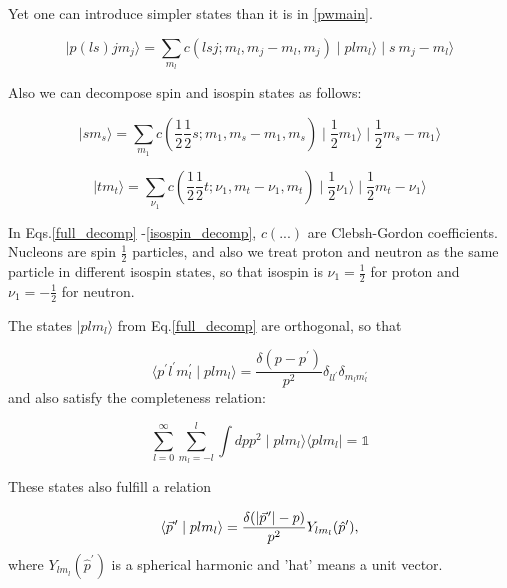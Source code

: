     Yet one can introduce simpler states than it is in \ref{pwmain}.
    
    \begin{equation}
        \mid p (ls) j m_j \rangle = \sum_{m_l} c(lsj;m_l, m_j\!-\!m_l, m_j) \mid p l m_l \rangle
        \mid s~m_j\!-\!m_l \rangle
        \label{full_decomp}
    \end{equation}

    Also we can decompose spin and isospin states as follows:

    \begin{equation}
        \mid s m_s \rangle = \sum_{m_1} c(\frac{1}{2}\frac{1}{2}s;m_1, m_s\!-\!m_1, m_s)
        \mid \frac{1}{2} m_1 \rangle
        \mid \frac{1}{2} m_s\!-\!m_1 \rangle
        \label{spin_decomp}
    \end{equation}

    \begin{equation}
        \mid t m_t \rangle = \sum_{\nu_1} c(\frac{1}{2}\frac{1}{2}t;\nu_1, m_t\!-\!\nu_1, m_t)
        \mid \frac{1}{2} \nu_1 \rangle
        \mid \frac{1}{2} m_t\!-\!\nu_1 \rangle
        \label{isospin_decomp}
    \end{equation}

    In Eqs.\ref{full_decomp} -\ref{isospin_decomp},  $c(...)$ are Clebsh-Gordon coefficients.
    Nucleons are spin $\frac{1}{2}$ particles, and also we treat proton and neutron as 
    the same particle in different 
    isospin states, so that isospin is $\nu_1 = \frac{1}{2}$ for proton and $\nu_1 = -\frac{1}{2}$ for neutron.

    The states $\mid p l m_l \rangle$ from Eq.\ref{full_decomp} are orthogonal, so that
    
    \begin{equation}
        \langle p^\prime l^\prime m_l^\prime \mid p l m_l \rangle = 
        \frac{\delta(p - p^\prime)}{p^2} \delta_{ll^\prime}\delta_{m_l m_l^\prime}
    \end{equation}
    and also satisfy the completeness relation:

    \begin{equation}
        \sum_{l=0}^\infty \sum_{m_l=-l}^l \int dp p^2 \mid plm_l \rangle \langle plm_l \mid = \mathbb{1}
    \end{equation}


    These states also fulfill a relation

    \begin{equation}
        \langle \pvec{p}^\prime \mid plm_l \rangle = 
        \frac{\delta ( \abs{\pvec{p}^\prime} - p)}{p^2} Y _{l m_l}(\hat{p}^\prime),
    \end{equation}
    where $Y _{l m_l}(\hat{p}^\prime)$ is a spherical harmonic and 'hat' means a unit vector.

